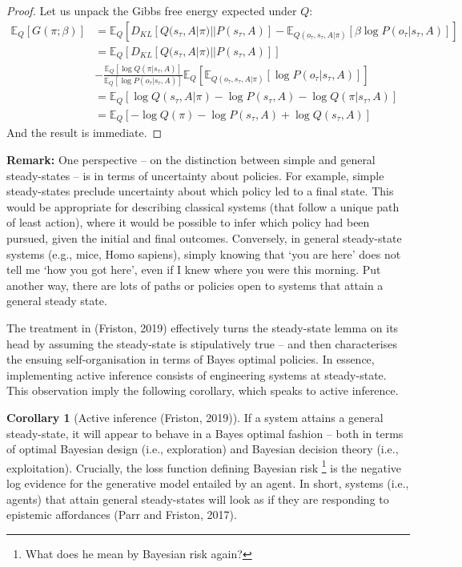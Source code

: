\documentclass{article}
\theoremstyle{plain}
\theoremstyle{definition}
\theoremstyle{proposition}
\theoremstyle{corollary}
\newtheorem{cor}[thm]{Corollary}
\theoremstyle{lemma}
\theoremstyle{remark}
\theoremstyle{example}
\begin{document}
\begin{proof}
Let us unpack the Gibbs free energy expected under $Q$:
\begin{equation}
    \begin{split}
        \mathbb E_Q[G(\pi; \beta)] &=\mathbb E_Q[D_{KL}[Q(s_\tau, A|\pi)||P(s_\tau,A)]-\mathbb E_{Q(o_\tau, s_\tau, A|\pi)} [\beta \log P(o_\tau |s_\tau, A)]] \\
        &= \mathbb E_Q[D_{KL}[Q(s_\tau, A|\pi)||P(s_\tau,A)]]\\
        &-\frac{\mathbb E_Q[\log Q(\pi|s_\tau,A)]}{\mathbb E_Q[\log P(o_\tau|s_\tau,A)]} \mathbb E_Q [\mathbb E_{Q(o_\tau, s_\tau, A|\pi)} [ \log P(o_\tau |s_\tau, A)]] \\
        &= \mathbb E_Q[\log Q(s_\tau, A|\pi)-\log P(s_\tau, A)-\log Q(\pi |s_\tau,A)] \\
        &= \mathbb E_Q[-\log Q(\pi)-\log P(s_\tau, A)+\log Q(s_\tau,A)]
    \end{split}
\end{equation}
And the result is immediate.
\end{proof}

\textbf{Remark:} One perspective – on the distinction between simple and general steady-states – is in terms of uncertainty about policies. For example, simple steady-states preclude uncertainty about which policy led to a final state. This would be appropriate for describing classical systems (that follow a unique path of least action), where it would be possible to infer which policy had been pursued, given the initial and final outcomes. Conversely, in general steady-state systems (e.g., mice, Homo sapiens), simply knowing that ‘you are here’ does not tell me ‘how you got here’, even if I knew where you were this morning. Put another way, there are lots of paths or policies open to systems that attain a general steady state.


The treatment in (Friston, 2019) effectively turns the steady-state lemma on its head by assuming the steady-state is stipulatively true – and then characterises the ensuing self-organisation in terms of Bayes optimal policies. In essence, implementing active inference consists of engineering systems at steady-state. This observation imply the following corollary, which speaks to active inference.

\begin{cor}[Active inference (Friston, 2019)]
 If a system attains a general steady-state, it will appear to behave in a Bayes optimal fashion – both in terms of optimal Bayesian design (i.e., exploration) and Bayesian decision theory (i.e., exploitation). Crucially, the loss function defining Bayesian risk \footnote{What does he mean by Bayesian risk again?} is the negative log evidence for the generative model entailed by an agent. In short, systems (i.e., agents) that attain general steady-states will look as if they are responding to epistemic affordances (Parr and Friston, 2017).
\end{cor}
\end{document}
